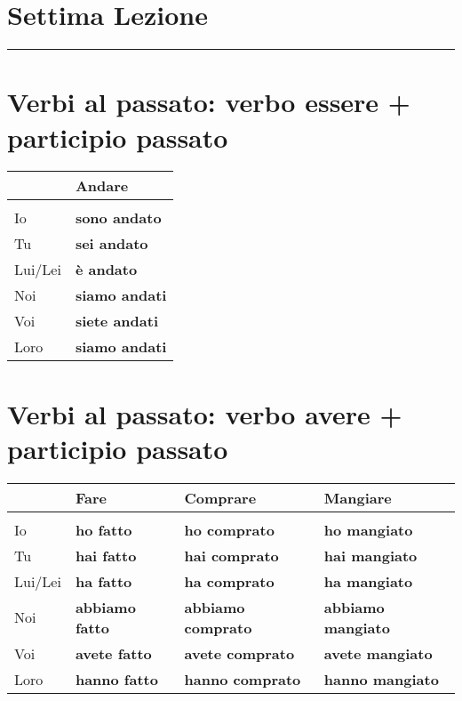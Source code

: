 \documentclass[letter,11pt]{article}
\begin{document}
\section*{\Large{Settima Lezione}}
\noindent\rule{16cm}{1pt}

\setlength{\parindent}{260pt}

\vskip 0.2in
\section*{Verbi al passato: verbo essere + participio passato}
\vskip 0.2in

\begin{tabular}{ |p{2cm}| p{3cm}| }
      & Andare   \\
    \hline
    \hline
     &    \\ \hline
    Io      & {\bf sono andato}     \\ \hline
    Tu      & {\bf sei andato}      \\ \hline
    Lui/Lei & {\bf è andato}        \\ \hline
    Noi     & {\bf siamo andati}    \\ \hline
    Voi     & {\bf siete andati}    \\ \hline
    Loro    & {\bf siamo andati}    \\ \hline
    \hline
\end{tabular}

\vskip 0.2in
\section*{Verbi al passato: verbo avere + participio passato}
\vskip 0.2in

\begin{tabular}{ |p{2cm}| p{4cm}| p{4cm}| p{4cm}| }
      & Fare  & Comprare & Mangiare  \\
    \hline
    \hline
     &  &  & \\ \hline
    Io      & {\bf ho fatto}      & {\bf ho comprato}     &  {\bf ho mangiato} \\ \hline
    Tu      & {\bf hai fatto}     & {\bf hai comprato}  &  {\bf hai mangiato}  \\ \hline
    Lui/Lei & {\bf ha fatto}      & {\bf ha comprato}   &  {\bf ha mangiato}\\ \hline
    Noi     & {\bf abbiamo fatto} & {\bf abbiamo comprato} & {\bf abbiamo mangiato} \\ \hline
    Voi     & {\bf avete fatto}   & {\bf avete comprato}   &  {\bf avete mangiato}  \\ \hline
    Loro    & {\bf hanno fatto}   & {\bf hanno comprato}   &  {\bf hanno mangiato}  \\ \hline
    \hline
\end{tabular}
\end{document}
